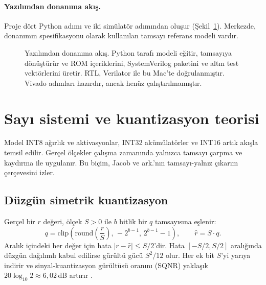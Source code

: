 \paragraph{Yazılımdan donanıma akış.} Proje dört Python adımı ve iki simülatör adımından oluşur (Şekil~\ref{fig:akis}). Merkezde, donanımın spesifikasyonu olarak kullanılan tamsayı referans modeli vardır.

\begin{figure}[h]
  \centering
  \caption[Yazılımdan donanıma akış]{Yazılımdan donanıma akış. Python tarafı modeli eğitir, tamsayıya dönüştürür ve ROM içeriklerini, SystemVerilog paketini ve altın test vektörlerini üretir. RTL, Verilator ile bu Mac'te doğrulanmıştır. Vivado adımları hazırdır, ancak henüz çalıştırılmamıştır.}
  \label{fig:akis}
\end{figure}

\section{Sayı sistemi ve kuantizasyon teorisi}\label{sec:kuant}

Model INT8 ağırlık ve aktivasyonlar, INT32 akümülatörler ve INT16 artık akışla temsil edilir. Gerçel ölçekler çalışma zamanında yalnızca tamsayı çarpma ve kaydırma ile uygulanır. Bu biçim, Jacob ve ark.'nın \cite{jacob18} tamsayı-yalnız çıkarım çerçevesini izler.

\subsection{Düzgün simetrik kuantizasyon}
Gerçel bir $r$ değeri, ölçek $S>0$ ile $b$ bitlik bir $q$ tamsayısına eşlenir:
\begin{equation}
  q = \mathrm{clip}\left( \mathrm{round}\left(\frac{r}{S}\right),\, -2^{b-1},\, 2^{b-1}-1 \right), \qquad \hat r = S \cdot q .
\end{equation}
Aralık içindeki her değer için hata $|r-\hat r| \le S/2$'dir. Hata $[-S/2, S/2]$ aralığında düzgün dağılımlı kabul edilirse gürültü gücü $S^2/12$ olur. Her ek bit $S$'yi yarıya indirir ve sinyal-kuantizasyon gürültüsü oranını (SQNR) yaklaşık $20\log_{10}2 \approx 6{,}02$\,dB artırır \cite{nagel21}.

